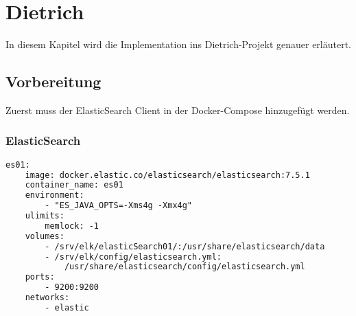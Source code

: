 \chapter{Dietrich}

In diesem Kapitel wird die Implementation ins Dietrich-Projekt genauer erläutert.

\section{Vorbereitung}

Zuerst muss der ElasticSearch Client in der Docker-Compose hinzugefügt werden. 

\subsection{ElasticSearch}

\begin{lstlisting}[language=XML, frame=single, label={lst:es01}] 
	es01:
	image: docker.elastic.co/elasticsearch/elasticsearch:7.5.1
	container_name: es01
	environment:
		- "ES_JAVA_OPTS=-Xms4g -Xmx4g"
	ulimits:
		memlock: -1
	volumes:
		- /srv/elk/elasticSearch01/:/usr/share/elasticsearch/data
		- /srv/elk/config/elasticsearch.yml:
			/usr/share/elasticsearch/config/elasticsearch.yml
	ports:
		- 9200:9200
	networks:
		- elastic
\end{lstlisting}

